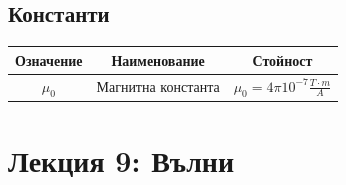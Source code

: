 \documentclass[fleqn, 12pt]{article}
\theoremstyle{definition}
\begin{document}
\newpage
\subsection{Константи}

\begin{center}
\begin{tabular}{ |c|c|c|}
\hline
\textbf{Означение} & \textbf{Наименование}&\textbf{Стойност}\\
\hline
$\mu_0$ & Магнитна константа & $\mu_0 = 4\pi10^{-7} \frac{T\cdot m}{A}$ \\
\hline
\end{tabular}
\end{center}


\newpage
\section{Лекция 9: Вълни}
\end{document}
